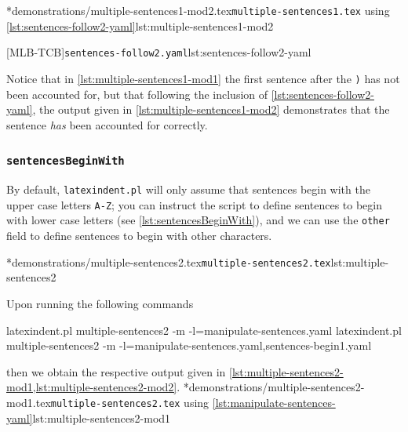 	\begin{minipage}{.55\linewidth}
		\cmhlistingsfromfile*[showspaces=false]*{demonstrations/multiple-sentences1-mod2.tex}{\texttt{multiple-sentences1.tex} using \cref{lst:sentences-follow2-yaml}}{lst:multiple-sentences1-mod2}
	\end{minipage}
	\hfill
	\begin{minipage}{.45\linewidth}
		[MLB-TCB]{\texttt{sentences-follow2.yaml}}{lst:sentences-follow2-yaml}
	\end{minipage}

	Notice that in \cref{lst:multiple-sentences1-mod1} the first sentence after the \texttt{)} has not been accounted for, but that
	following the inclusion of \cref{lst:sentences-follow2-yaml}, the output given in \cref{lst:multiple-sentences1-mod2} demonstrates that
	the sentence \emph{has} been accounted for correctly.

\subsubsection{\texttt{sentencesBeginWith}}
	By default, \texttt{latexindent.pl} will only assume that sentences begin with the upper case letters \texttt{A-Z}; you can instruct the
	script to define sentences to begin with lower case letters (see \cref{lst:sentencesBeginWith}), and we can use the \texttt{other} field
	to define sentences to begin with other characters.

	\cmhlistingsfromfile*[showspaces=false]*{demonstrations/multiple-sentences2.tex}{\texttt{multiple-sentences2.tex}}{lst:multiple-sentences2}

	Upon running the following commands
	\begin{widepage}
		\begin{commandshell}
latexindent.pl multiple-sentences2 -m -l=manipulate-sentences.yaml
latexindent.pl multiple-sentences2 -m -l=manipulate-sentences.yaml,sentences-begin1.yaml
	\end{commandshell}
	\end{widepage}
	then we obtain the respective output given in \cref{lst:multiple-sentences2-mod1,lst:multiple-sentences2-mod2}.
	\cmhlistingsfromfile*[showspaces=false]*{demonstrations/multiple-sentences2-mod1.tex}{\texttt{multiple-sentences2.tex} using \vref{lst:manipulate-sentences-yaml}}{lst:multiple-sentences2-mod1}

